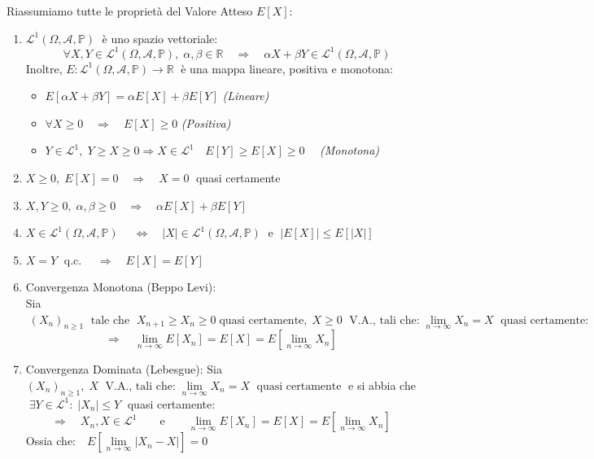 \begin{teorema}
    Riassumiamo tutte le proprietà del Valore Atteso $E[X]$:
    \begin{enumerate}
        \item $\mathcal{L}^1(\Omega, \mathcal{A}, \mathbb{P})\;$ è uno spazio vettoriale: \[\quad \forall X, Y\in\mathcal{L}^1(\Omega, \mathcal{A}, \mathbb{P}), \; \alpha, \beta \in \mathbb{R} \quad \Rightarrow\quad \alpha X + \beta Y \in \mathcal{L}^1(\Omega, \mathcal{A}, \mathbb{P})\]
        Inoltre, $E :\mathcal{L}^1(\Omega, \mathcal{A}, \mathbb{P})\longrightarrow\mathbb{R}\;$ è una mappa lineare, positiva e monotona:
        \begin{itemize}
            \item $E[\alpha X + \beta Y] = \alpha E[X] + \beta E[Y]$ \hfill \textit{(Lineare)}
            \item $\forall X\geq0 \quad \Rightarrow \quad E[X]\geq 0$ \hfill \textit{(Positiva)}
            \item $Y\in \mathcal{L}^1, \;Y\geq X\geq 0 \Rightarrow X\in \mathcal{L}^1\quad E[Y] \geq E[X]\geq 0 \quad$ \hfill \textit{(Monotona)}
        \end{itemize}

    \item $X\geq 0, \;E[X] = 0 \quad \Rightarrow\quad X =0\; $ quasi certamente
    \item $X, Y \geq0, \; \alpha, \beta \geq0 \quad \Rightarrow\quad \alpha E[X] + \beta E[Y]$
    \item $X\in \mathcal{L}^1(\Omega, \mathcal{A}, \mathbb{P})\; \quad \iff \quad |X| \in \mathcal{L}^1(\Omega, \mathcal{A}, \mathbb{P})\;\text{ e }\; \left|E[X]\right| \leq E[|X|]$
    \item $X = Y\;$ q.c. $\quad \Rightarrow\quad E[X] = E[Y]$
    \item Convergenza Monotona (Beppo Levi):\\
    Sia \(\;(X_n)_{n\geq1}\;\text{ tale che }\; X_{n+1} \geq X_n\geq 0\;\text{quasi certamente},\;X\geq0\;\text{ V.A., tali che:}\;\underset{n\to\infty}{\lim} X_n = X\; \text{ quasi certamente}:\)
    \[\Rightarrow\quad \lim_{n\to\infty}E[X_n] = E[X] = E\left[\lim_{n\to\infty}X_n \right]\]
    \item Convergenza Dominata (Lebesgue):
    Sia $(X_n)_{n\geq1},\; X \;\text{ V.A., tali che:}\; \underset{n\to\infty}{\lim} X_n = X\; \text{ quasi certamente}\;$ e si abbia che $\;\exists Y\in \mathcal{L}^1:\; |X_n|\leq Y\;$ quasi certamente:
    \[\Rightarrow\quad X_n, X\in \mathcal{L}^1\qquad \text{e}\qquad \lim_{n\to\infty}E[X_n] = E[X] = E\left[\lim_{n\to\infty}X_n \right]\]
    Ossia che:$\quad E\left[\underset{n\to\infty}{\lim}|X_n-X| \right] = 0$
    \end{enumerate}
\end{teorema}

